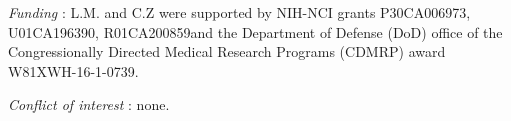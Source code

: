 \documentclass[12pt,halfline,a4paper,]{ouparticle}
\begin{document}
\begin{notes}[Acknowledgements]
\emph{Funding} : L.M. and C.Z were supported by NIH-NCI grants
P30CA006973, U01CA196390, R01CA200859and the Department of Defense (DoD)
office of the Congressionally Directed Medical Research Programs (CDMRP)
award W81XWH-16-1-0739.

\emph{Conflict of interest} : none.
\end{notes}


\renewcommand\refname{References}


\end{document}

